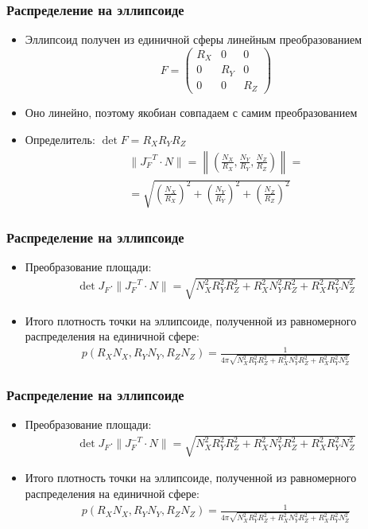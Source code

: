 \documentclass[handout,10pt]{beamer}
\begin{document}
\begin{frame}
\frametitle{Распределение на эллипсоиде}
\begin{itemize}
\item Эллипсоид получен из единичной сферы линейным преобразованием
\begin{equation*}
F = \begin{pmatrix}
R_X & 0 & 0 \\
0 & R_Y & 0 \\
0 & 0 & R_Z 
\end{pmatrix}
\end{equation*}
\pause
\item Оно линейно, поэтому якобиан совпадаем с самим преобразованием
\pause
\item Определитель: \begin{math}\det F = R_XR_YR_Z\end{math}
\pause
\begin{gather*}
\|J_F^{-T} \cdot N\| = \left\|\left(\frac{N_X}{R_X}, \frac{N_Y}{R_Y}, \frac{N_Z}{R_Z}\right)\right\| = \\
= \sqrt{\left(\frac{N_X}{R_X}\right)^2+\left(\frac{N_Y}{R_Y}\right)^2+\left(\frac{N_Z}{R_Z}\right)^2}
\end{gather*}
\end{itemize}
\end{frame}

\begin{frame}
\frametitle{Распределение на эллипсоиде}
\begin{itemize}
\item Преобразование площади:
\begin{gather*}
\det J_F \cdot \|J_F^{-T} \cdot N\| = \sqrt{N_X^2R_Y^2R_Z^2 + R_X^2N_Y^2R_Z^2 + R_X^2R_Y^2N_Z^2}
\end{gather*}
\pause
\item Итого плотность точки на эллипсоиде, полученной из равномерного распределения на единичной сфере:
\begin{gather*}
p(R_XN_X,R_YN_Y,R_ZN_Z) = \frac{1}{4\pi\sqrt{N_X^2R_Y^2R_Z^2 + R_X^2N_Y^2R_Z^2 + R_X^2R_Y^2N_Z^2}}
\end{gather*}
\end{itemize}
\end{frame}

\begin{frame}
\frametitle{Распределение на эллипсоиде}
\begin{itemize}
\item Преобразование площади:
\begin{gather*}
\det J_F \cdot \|J_F^{-T} \cdot N\| = \sqrt{N_X^2R_Y^2R_Z^2 + R_X^2N_Y^2R_Z^2 + R_X^2R_Y^2N_Z^2}
\end{gather*}
\pause
\item Итого плотность точки на эллипсоиде, полученной из равномерного распределения на единичной сфере:
\begin{gather*}
p(R_XN_X,R_YN_Y,R_ZN_Z) = \frac{1}{4\pi\sqrt{N_X^2R_Y^2R_Z^2 + R_X^2N_Y^2R_Z^2 + R_X^2R_Y^2N_Z^2}}
\end{gather*}
\end{itemize}
\end{frame}
\end{document}
